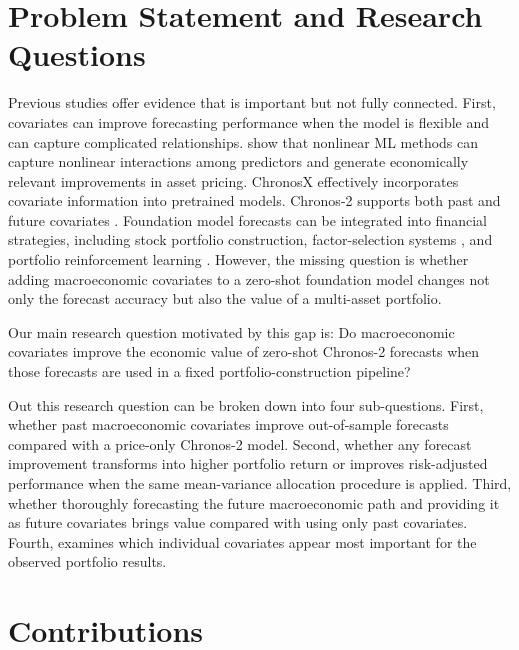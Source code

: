 \documentclass[12pt,a4paper,twoside,openany]{book}
\begin{document}
\section{Problem Statement and Research
Questions}\label{problem-statement-and-research-questions}

Previous studies offer evidence that is important but not fully connected. First, covariates can improve forecasting performance when the model is flexible and can capture complicated relationships. \cite{gu2020empirical} show that nonlinear ML methods can capture nonlinear interactions among predictors and generate economically relevant improvements in asset pricing. \cite{arango2025chronosx} ChronosX effectively incorporates covariate information into pretrained models. Chronos-2 supports both past and future covariates \cite{ansari2025chronos2}. Foundation model forecasts can be integrated into financial strategies, including stock portfolio construction, factor-selection systems \cite{engel2025scaling}, and portfolio reinforcement learning \cite{pishehvar2026threephase}. However, the missing question is whether adding macroeconomic covariates to a zero-shot foundation model changes not only the forecast accuracy but also the value of a multi-asset portfolio.

Our main research question motivated by this gap is: Do macroeconomic covariates improve the economic value of zero-shot Chronos-2 forecasts when those forecasts are used in a fixed portfolio-construction pipeline?

Out this research question can be broken down into four sub-questions. First, whether past macroeconomic covariates improve out-of-sample forecasts compared with a price-only Chronos-2 model. Second, whether any forecast improvement transforms into higher portfolio return or improves risk-adjusted performance when the same mean-variance allocation procedure is applied. Third, whether thoroughly forecasting the future macroeconomic path and providing it as future covariates brings value compared with using only past covariates. Fourth, examines which individual covariates appear most important for the observed portfolio results.

\section{Contributions}\label{contributions}
\end{document}
